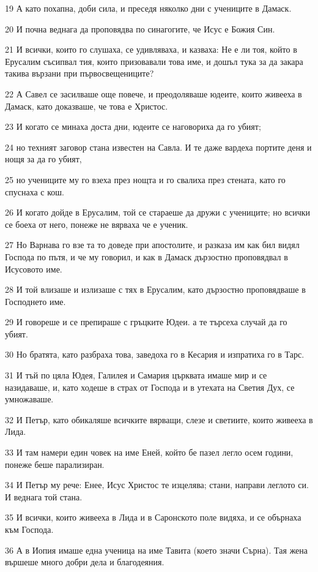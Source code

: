 \par 19 А като похапна, доби сила, и преседя няколко дни с учениците в Дамаск.
\par 20 И почна веднага да проповядва по синагогите, че Исус е Божия Син.
\par 21 И всички, които го слушаха, се удивляваха, и казваха: Не е ли тоя, който в Ерусалим съсипвал тия, които призовавали това име, и дошъл тука за да закара такива вързани при първосвещениците?
\par 22 А Савел се засилваше още повече, и преодоляваше юдеите, които живееха в Дамаск, като доказваше, че това е Христос.
\par 23 И когато се минаха доста дни, юдеите се наговориха да го убият;
\par 24 но техният заговор стана известен на Савла. И те даже вардеха портите деня и нощя за да го убият,
\par 25 но учениците му го взеха през нощта и го свалиха през стената, като го спуснаха с кош.
\par 26 И когато дойде в Ерусалим, той се стараеше да дружи с учениците; но всички се боеха от него, понеже не вярваха че е ученик.
\par 27 Но Варнава го взе та то доведе при апостолите, и разказа им как бил видял Господа по пътя, и че му говорил, и как в Дамаск дързостно проповядвал в Исусовото име.
\par 28 И той влизаше и излизаше с тях в Ерусалим, като дързостно проповядваше в Господнето име.
\par 29 И говореше и се препираше с гръцките Юдеи. а те търсеха случай да го убият.
\par 30 Но братята, като разбраха това, заведоха го в Кесария и изпратиха го в Тарс.
\par 31 И тъй по цяла Юдея, Галилея и Самария църквата имаше мир и се назидаваше, и, като ходеше в страх от Господа и в утехата на Светия Дух, се умножаваше.
\par 32 И Петър, като обикаляше всичките вярващи, слезе и светиите, които живееха в Лида.
\par 33 И там намери един човек на име Еней, който бе пазел легло осем години, понеже беше парализиран.
\par 34 И Петър му рече: Енее, Исус Христос те изцелява; стани, направи леглото си. И веднага той стана.
\par 35 И всички, които живееха в Лида и в Саронското поле видяха, и се обърнаха към Господа.
\par 36 А в Иопия имаше една ученица на име Тавита (което значи Сърна). Тая жена вършеше много добри дела и благодеяния.

